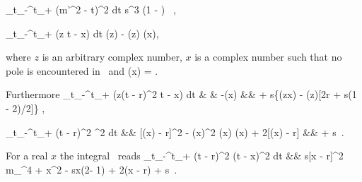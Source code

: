 \int_{t_-}^{t_+} (m'^2 - t)^2 dt 
\; \approx \;
{s^3 } (1 - \rho) \,
,
\ee

\int_{t_-}^{t_+} \Re\left({z \over t - x}\right) dt
\; \approx \;
\Re(z)\ln{}
- \Im(z) \phi(x),
\ee

where $z$ is an arbitrary complex number, 
$x$ is a complex number such that no pole is encountered in~
and
\phi(x) \; = \;
.
\ee

Furthermore
\int_{t_-}^{t_+} \Re\left(z{(t - r)^2 \over t - x}\right) dt 
& \approx &
\Re[z(x - r)^2] \ln{}
-\Im[z(x - r)^2] \phi(x)
\nel
&&{}
+ s\{\Re(zx) - \Re(z)[2r + s(1 - 2\rho)/2]\}
,
\nel
\ee

\int_{t_-}^{t_+} {(t - r)^2 \over {}^2} dt
&\approx&
{[\Re(x) - r]^2 - \Im(x)^2 \over \Im(x)} \phi(x)
+ 2[\Re(x) - r]\ln{}
\nel
&&{}
+ s\, 
.
\ee

For a real $x$ the integral~ reads
\int_{t_-}^{t_+} {(t - r)^2 \over (t - x)^2} dt
&\approx&
{s[x - r]^2 \over m_\chi^4 + x^2 - sx(2\rho - 1)}
+ 2(x - r)\ln{}
+ s\,
.
\nel
\ee

